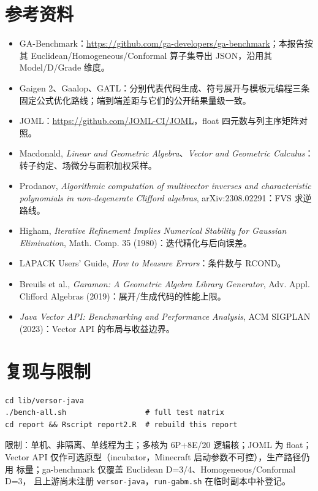 \documentclass[10pt,a4paper]{article}
\begin{document}
\section{参考资料}
\begin{itemize}
\item GA-Benchmark：\url{https://github.com/ga-developers/ga-benchmark}；本报告按其
      Euclidean/Homogeneous/Conformal 算子集导出 JSON，沿用其 Model/D/Grade 维度。
\item Gaigen 2、Gaalop、GATL：分别代表代码生成、符号展开与模板元编程三条
      固定公式优化路线；端到端差距与它们的公开结果量级一致。
\item JOML：\url{https://github.com/JOML-CI/JOML}，float 四元数与列主序矩阵对照。
\item Macdonald, \emph{Linear and Geometric Algebra}、\emph{Vector and Geometric
      Calculus}：转子约定、场微分与面积加权采样。
\item Prodanov, \emph{Algorithmic computation of multivector inverses and
      characteristic polynomials in non-degenerate Clifford algebras},
      arXiv:2308.02291：FVS 求逆路线。
\item Higham, \emph{Iterative Refinement Implies Numerical Stability for
      Gaussian Elimination}, Math. Comp. 35 (1980)：迭代精化与后向误差。
\item LAPACK Users' Guide, \emph{How to Measure Errors}：条件数与 RCOND。
\item Breuils et al., \emph{Garamon: A Geometric Algebra Library Generator},
      Adv. Appl. Clifford Algebras (2019)：展开/生成代码的性能上限。
\item \emph{Java Vector API: Benchmarking and Performance Analysis},
      ACM SIGPLAN (2023)：Vector API 的布局与收益边界。
\end{itemize}

\section{复现与限制}
\begin{verbatim}
cd lib/versor-java
./bench-all.sh                  # full test matrix
cd report && Rscript report2.R  # rebuild this report
\end{verbatim}

限制：单机、非隔离、单线程为主；多核为 6P+8E/20 逻辑核；JOML 为 float；
Vector API 仅作可选原型（incubator，Minecraft 启动参数不可控），生产路径仍用
标量；ga-benchmark 仅覆盖 Euclidean D=3/4、Homogeneous/Conformal D=3，
且上游尚未注册 \texttt{versor-java}，\texttt{run-gabm.sh} 在临时副本中补登记。
\end{document}

